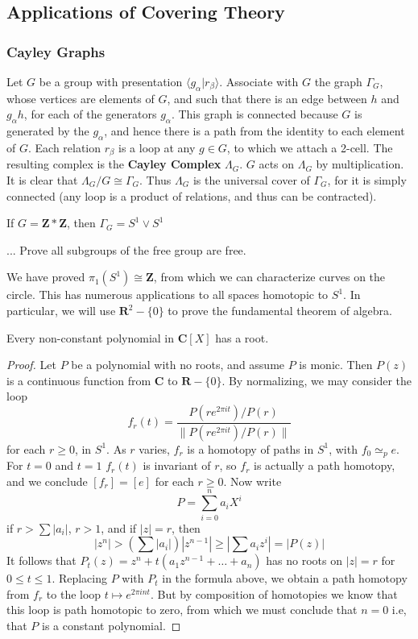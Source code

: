 \subsection{Applications of Covering Theory}

\subsubsection{Cayley Graphs}

Let $G$ be a group with presentation $\langle g_\alpha | r_\beta \rangle$. Associate with $G$ the graph $\Gamma_G$, whose vertices are elements of $G$, and such that there is an edge between $h$ and $g_\alpha h$, for each of the generators $g_\alpha$. This graph is connected because $G$ is generated by the $g_\alpha$, and hence there is a path from the identity to each element of $G$. Each relation $r_\beta$ is a loop at any $g \in G$, to which we attach a 2-cell. The resulting complex is the {\bf Cayley Complex} $\Lambda_G$. $G$ acts on $\Lambda_G$ by multiplication. It is clear that $\Lambda_G/G \cong \Gamma_G$. Thus $\Lambda_G$ is the universal cover of $\Gamma_G$, for it is simply connected (any loop is a product of relations, and thus can be contracted).

\begin{example}
    If $G = \mathbf{Z} * \mathbf{Z}$, then $\Gamma_G = S^1 \vee S^1$
\end{example}

... Prove all subgroups of the free group are free.

We have proved $\pi_1(S^1) \cong \mathbf{Z}$, from which we can characterize curves on the circle. This has numerous applications to all spaces homotopic to $S^1$. In particular, we will use $\mathbf{R}^2 - \{ 0 \}$ to prove the fundamental theorem of algebra.

\begin{theorem}
    Every non-constant polynomial in $\mathbf{C}[X]$ has a root.
\end{theorem}
\begin{proof}
    Let $P$ be a polynomial with no roots, and assume $P$ is monic. Then $P(z)$ is a continuous function from $\mathbf{C}$ to $\mathbf{R} - \{ 0 \}$. By normalizing, we may consider the loop
    \[ f_r(t) = \frac{P(re^{2\pi i t})/P(r)}{\| P(re^{2 \pi i t})/P(r) \|} \]
    for each $r \geq 0$, in $S^1$. As $r$ varies, $f_r$ is a homotopy of paths in $S^1$, with $f_0 \simeq_p e$. For $t = 0$ and $t = 1$ $f_r(t)$ is invariant of $r$, so $f_r$ is actually a path homotopy, and we conclude $[f_r] = [e]$ for each $r \geq 0$. Now write
    \[ P = \sum_{i = 0}^n a_i X^i \]
    if $r > \sum |a_i|$, $r > 1$, and if $|z| = r$, then
    \[ |z^n| > (\sum |a_i|) |z^{n-1}| \geq |\sum a_i z^i| = |P(z)| \]
    It follows that $P_t(z) = z^n + t(a_1 z^{n-1} + \dots + a_n)$ has no roots on $|z| = r$ for $0 \leq t \leq 1$. Replacing $P$ with $P_t$ in the formula above, we obtain a path homotopy from $f_r$ to the loop $t \mapsto e^{2 \pi i n t}$. But by composition of homotopies we know that this loop is path homotopic to zero, from which we must conclude that $n = 0$ i.e, that $P$ is a constant polynomial.
\end{proof}

